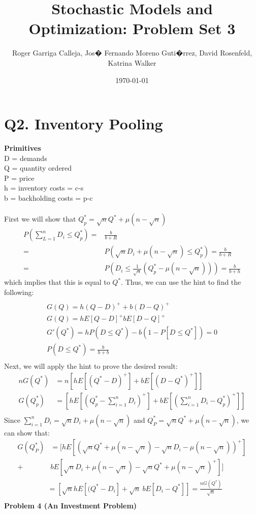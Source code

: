 \documentclass[11pt, english]{article}
\title{Stochastic Models and Optimization: Problem Set 3}
\author{Roger Garriga Calleja, Jos� Fernando Moreno Guti�rrez, David Rosenfeld, Katrina Walker}
\date{\today}
\begin{document}
	
\section{Q2. Inventory Pooling}
\textbf{Primitives}\\ D = demands \\ Q = quantity ordered \\ P = price \\ h =
inventory costs =  c-s \\ b = backholding costs = p-c \\ \\ First we will show
that $Q_p^* = \sqrt{n}Q^* + \mu(n- \sqrt{n})$%
\begin{align*} P (\sum_{L= 1}^n D_i \leq Q_p^*) = &  \frac{b}{b+R} \\ = &
P(\sqrt{n}D_i + \mu(n - \sqrt{n})\leq Q_p^*) = \frac{b}{b+R} \\ = & P(D_i \leq
\frac{1}{\sqrt{n}}(Q_p^*- \mu(n-\sqrt{n})))= \frac{b}{b + h} \end{align*} which
implies that this is equal to $Q^*$. Thus, we can use the hint to find the
following: 
\begin{align*} %
\end{align*}
\begin{align*} G(Q) =  h(Q-D)^++b(D-Q)^+ \\ G(Q) = hE[Q-D]^+bE[D-Q]^+ \\ G'(Q^*)= hP(D \leq Q^*) - b(1-P[D\leq Q^*]) =
0 \\ P(D \leq Q^*) = \frac{b}{h+b} \\ 
\end{align*} Next, we will apply the hint to prove the desired result:
\begin{align*} nG(Q^*) &=
n[hE[(Q^*-D)^+]+bE[(D-Q^*)^+]]\\ G(Q^*_p) & =
[hE[(Q^*_p-\sum_{i=1}^nD_i)^+]+bE[(\sum_{i=1}^nD_i-Q^*_p)^+]]\\ 
\end{align*} 
Since $\sum_{i = 1}^nD_i = \sqrt{n}D_i+\mu(n-\sqrt{n})$ and $Q^*_P = \sqrt{n}Q^*+\mu(n-\sqrt{n})$, we can show that:\\
\begin{align*} 
G(Q^*_P) & =  [hE[(\sqrt{n}Q^*+\mu(n-\sqrt{n})-\sqrt{n}D_i-\mu(n-\sqrt{n}))^+] \\
+& b E[\sqrt{n}D_i+\mu(n-\sqrt{n})-\sqrt{n}Q^*+\mu(n-\sqrt{n})^+]]\
\end{align*} 
\begin{align*} 
& = [\sqrt{n}hE[(Q^*-D_i]  + \sqrt{n} \ b E[D_i-Q^*]] = \frac{nG(Q^*)}{\sqrt{n}}\\ 
\end{align*} 
\textbf{Problem 4 (An Investment Problem)}
\end{document}
